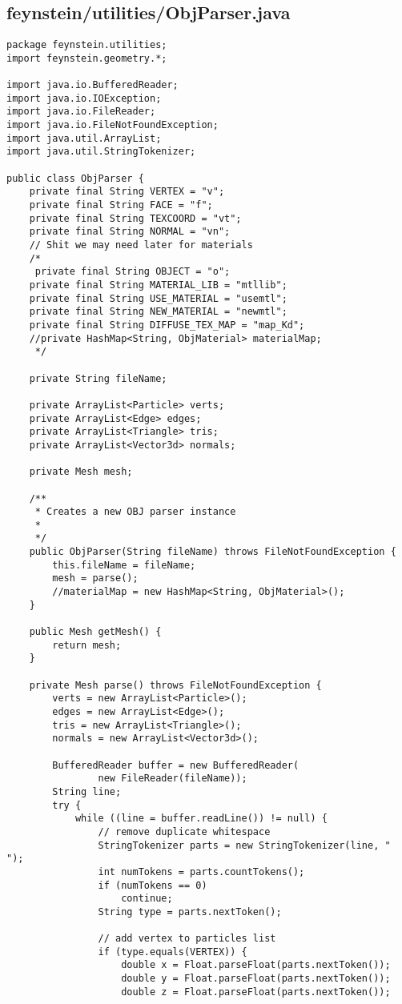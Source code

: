\subsection*{feynstein/utilities/ObjParser.java}
\begin{lstlisting}
package feynstein.utilities;
import feynstein.geometry.*;

import java.io.BufferedReader;
import java.io.IOException;
import java.io.FileReader;
import java.io.FileNotFoundException;
import java.util.ArrayList;
import java.util.StringTokenizer;

public class ObjParser {
	private final String VERTEX = "v";
	private final String FACE = "f";
	private final String TEXCOORD = "vt";
	private final String NORMAL = "vn";
	// Shit we may need later for materials
	/*
	 private final String OBJECT = "o";
	private final String MATERIAL_LIB = "mtllib";
	private final String USE_MATERIAL = "usemtl";
	private final String NEW_MATERIAL = "newmtl";
	private final String DIFFUSE_TEX_MAP = "map_Kd";
	//private HashMap<String, ObjMaterial> materialMap;
	 */
	
	private String fileName;

	private ArrayList<Particle> verts;
	private ArrayList<Edge> edges;
	private ArrayList<Triangle> tris;
	private ArrayList<Vector3d> normals;
	
	private Mesh mesh;
	
	/**
	 * Creates a new OBJ parser instance
	 * 
	 */
	public ObjParser(String fileName) throws FileNotFoundException {
		this.fileName = fileName;
		mesh = parse();
		//materialMap = new HashMap<String, ObjMaterial>();
	}

	public Mesh getMesh() {
		return mesh;
	}
	
	private Mesh parse() throws FileNotFoundException {
		verts = new ArrayList<Particle>();
		edges = new ArrayList<Edge>();
		tris = new ArrayList<Triangle>();
		normals = new ArrayList<Vector3d>();
		
		BufferedReader buffer = new BufferedReader(
				new FileReader(fileName));
		String line;
		try {
			while ((line = buffer.readLine()) != null) {
				// remove duplicate whitespace
				StringTokenizer parts = new StringTokenizer(line, " ");
				int numTokens = parts.countTokens();
				if (numTokens == 0)
					continue;
				String type = parts.nextToken();

				// add vertex to particles list
				if (type.equals(VERTEX)) {
					double x = Float.parseFloat(parts.nextToken());
					double y = Float.parseFloat(parts.nextToken());
					double z = Float.parseFloat(parts.nextToken());
					

\end{lstlisting}
